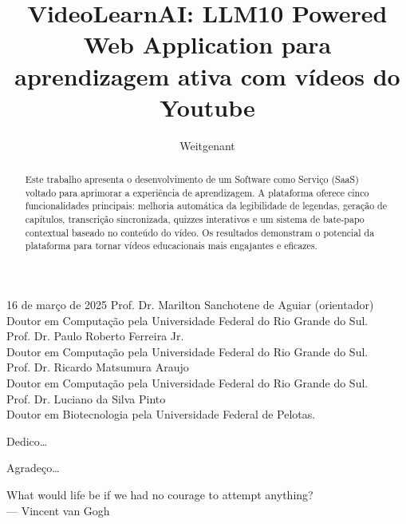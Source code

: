 \documentclass[tcc,capa]{texufpel}
\title{VideoLearnAI: LLM10 Powered Web Application para aprendizagem ativa com vídeos do Youtube}
\author{Weitgenant}{Kevin Castro}
\begin{document}

\maketitle 

\sloppy

\fichacatalografica


\begin{aprovacao}{16 de março de 2025} %
\noindent Prof. Dr. Marilton Sanchotene de Aguiar (orientador)\\
Doutor em Computação pela Universidade Federal do Rio Grande do Sul.\\[1cm]

\noindent Prof. Dr. Paulo Roberto Ferreira Jr.\\
Doutor em Computação pela Universidade Federal do Rio Grande do Sul.\\[1cm]

\noindent Prof. Dr. Ricardo Matsumura Araujo\\
Doutor em Computação pela Universidade Federal do Rio Grande do Sul.\\[1cm]

\noindent Prof. Dr. Luciano da Silva Pinto\\
Doutor em Biotecnologia pela Universidade Federal de Pelotas.
\end{aprovacao}

\begin{dedicatoria}
  Dedico\ldots 
\end{dedicatoria}

\begin{agradecimentos}
  Agradeço\ldots 
\end{agradecimentos}

\begin{epigrafe}
  What would life be if we had no courage to attempt anything?\\
  {\sc --- Vincent van Gogh}
\end{epigrafe}


\begin{abstract}
  Este trabalho apresenta o desenvolvimento de um Software como Serviço (SaaS) voltado para aprimorar a experiência de aprendizagem. A plataforma oferece cinco funcionalidades principais: melhoria automática da legibilidade de legendas, geração de capítulos, transcrição sincronizada, quizzes interativos e um sistema de bate-papo contextual baseado no conteúdo do vídeo. Os resultados demonstram o potencial da plataforma para tornar vídeos educacionais mais engajantes e eficazes.
  
  \end{abstract}
  
\end{document}

